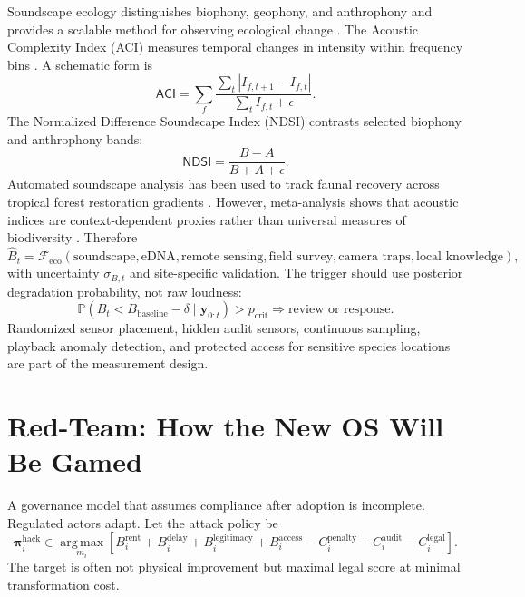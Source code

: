 \documentclass[11pt,a4paper]{article}
\numberwithin{equation}{section}
\theoremstyle{definition}
\theoremstyle{plain}
\theoremstyle{remark}
\newcommand{\Pp}{\mathbb{P}}
\newcommand{\argmax}{\operatorname*{arg\,max}}
\newcommand{\policy}{\boldsymbol{\pi}}
\begin{document}
Soundscape ecology distinguishes biophony, geophony, and anthrophony and provides a scalable method for observing ecological change \citep{pijanowski2011}. The Acoustic Complexity Index (ACI) measures temporal changes in intensity within frequency bins \citep{pieretti2011}. A schematic form is
\begin{equation}
\mathsf{ACI}=\sum_f
\frac{\sum_t |I_{f,t+1}-I_{f,t}|}
{\sum_t I_{f,t}+\epsilon}.
\label{eq:aci}
\end{equation}
The Normalized Difference Soundscape Index (NDSI) contrasts selected biophony and anthrophony bands:
\begin{equation}
\mathsf{NDSI}=\frac{B-A}{B+A+\epsilon}.
\label{eq:ndsi}
\end{equation}
Automated soundscape analysis has been used to track faunal recovery across tropical forest restoration gradients \citep{muller2023}. However, meta-analysis shows that acoustic indices are context-dependent proxies rather than universal measures of biodiversity \citep{alcocer2022}. Therefore
\begin{equation}
\widehat B_t=
\mathcal F_{\mathrm{eco}}
\left(
\text{soundscape},\text{eDNA},\text{remote sensing},
\text{field survey},\text{camera traps},\text{local knowledge}
\right),
\label{eq:ecosensorfusion}
\end{equation}
with uncertainty $\sigma_{B,t}$ and site-specific validation. The trigger should use posterior degradation probability, not raw loudness:
\begin{equation}
\Pp(B_t<B_{\mathrm{baseline}}-\delta\mid\bm y_{0:t})>p_{\mathrm{crit}}
\Longrightarrow \text{review or response}.
\label{eq:ecotrigger}
\end{equation}
Randomized sensor placement, hidden audit sensors, continuous sampling, playback anomaly detection, and protected access for sensitive species locations are part of the measurement design.

\section{Red-Team: How the New OS Will Be Gamed}

A governance model that assumes compliance after adoption is incomplete. Regulated actors adapt. Let the attack policy be
\begin{equation}
\policy_i^{\mathrm{hack}}\in\argmax_{m_i}
\left[
B_i^{\mathrm{rent}}+B_i^{\mathrm{delay}}+B_i^{\mathrm{legitimacy}}
+B_i^{\mathrm{access}}
-C_i^{\mathrm{penalty}}-C_i^{\mathrm{audit}}-C_i^{\mathrm{legal}}
\right].
\label{eq:hackutility}
\end{equation}
The target is often not physical improvement but maximal legal score at minimal transformation cost.
\end{document}
